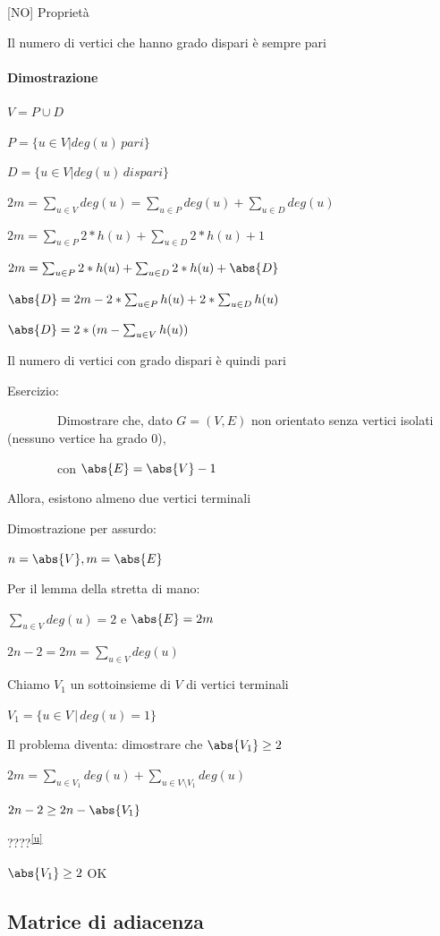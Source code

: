 \documentclass[11pt,a4paper,twoside,openright]{book}
\let\oldparagraph\paragraph
\renewcommand{\paragraph}[1]{\oldparagraph{#1}\mbox{}}
\begin{document}
{{[}NO{]} Proprietà}

{Il numero di vertici che hanno grado dispari è sempre pari}

\paragraph{Dimostrazione}

$V=P\cup D$

$P = \{u \in V | deg(u) \, pari\}$

$D = \{u \in V | deg(u) \, dispari\}$

$2m = \sum_{u \in V}{deg(u)} = \sum_{u \in P}{deg(u)} + \sum_{u \in D}{deg(u)}$

$2m = \sum_{u \in P}{2*h(u)} + \sum_{u \in D}{2*h(u)+1}$

$2m = \sum_{u \in P}{2*h(u)} + \sum_{u \in D}{2*h(u)} + \abs{D}$

$\abs{D} = 2m - 2 *\sum_{u \in P}{h(u)} + 2*\sum_{u \in D}{h(u)}$

$\abs{D} = 2*(m-\sum_{u \in V}{h(u)})$

{Il numero di vertici con grado dispari è quindi pari}

{Esercizio: }

{~~~~~~~~Dimostrare che, dato $G=(V,E)$ non orientato senza vertici isolati (nessuno vertice ha grado 0),}

{~~~~~~~~con $\abs{E} = \abs{V} -1$}

{Allora, esistono almeno due vertici terminali}

{Dimostrazione per assurdo:}

$n=\abs{V},m=\abs{E}$

{Per il lemma della stretta di mano:}

$\sum_{u \in V}{deg(u)} = 2$ e $\abs{E} = 2m$

$2n-2 = 2m = \sum_{u \in V}{deg(u)}$

{Chiamo $V_1$ un sottoinsieme di $V$ di vertici terminali}

$V_1=\{u\in V\,|\,deg(u)=1\}$

{Il problema diventa: dimostrare che $\abs{V_1} \geq 2$}

$2m = \sum_{u \in V_1}{deg(u)} +  \sum_{u \in V \setminus V_1}{deg(u)}$

$2n -2 \geq 2n - \abs{V_1}$

{????}\textsuperscript{\protect\hyperlink{cmnt21}{{[}u{]}}}

{$\abs{V_1} \geq 2$ OK}

\subsection{Matrice di adiacenza}
\end{document}

